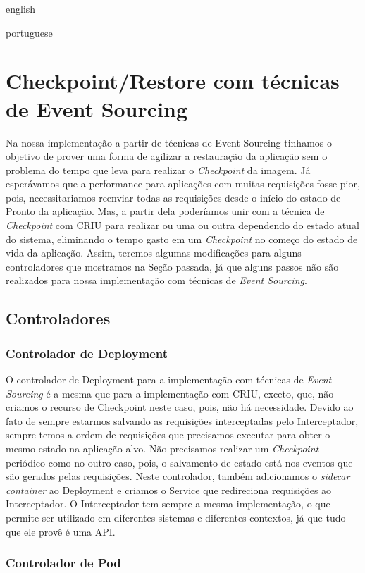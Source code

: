\begin{otherlanguage*}{english}
\begin{otherlanguage*}{portuguese}
\section{Checkpoint/Restore com técnicas de Event Sourcing}

Na nossa implementação a partir de técnicas de Event Sourcing tinhamos o objetivo de
prover uma forma de agilizar a restauração da aplicação sem o problema do tempo que leva
para realizar o \textit{Checkpoint} da imagem. Já esperávamos que a performance para
aplicações com muitas requisições fosse pior, pois, necessitariamos reenviar todas as
requisições desde o início do estado de Pronto da aplicação. Mas, a partir dela
poderíamos unir com a técnica de \textit{Checkpoint} com CRIU para realizar ou uma ou
outra dependendo do estado atual do sistema, eliminando o tempo gasto em um
\textit{Checkpoint} no começo do estado de vida da aplicação. Assim, teremos algumas
modificações para alguns controladores que mostramos na Seção passada, já que alguns
passos não são realizados para nossa implementação com técnicas de \textit{Event Sourcing}.

\subsection{Controladores}

\subsubsection{Controlador de Deployment}

O controlador de Deployment para a implementação com técnicas de \textit{Event Sourcing} é
a mesma que para a implementação com CRIU, exceto, que, não criamos o recurso de Checkpoint neste
caso, pois, não há necessidade. Devido ao fato de sempre estarmos salvando as requisições
interceptadas pelo Interceptador, sempre temos a ordem de requisições que precisamos
executar para obter o mesmo estado na aplicação alvo. Não precisamos realizar um
\textit{Checkpoint} periódico como no outro caso, pois, o salvamento de estado está nos
eventos que são gerados pelas requisições. Neste controlador, também adicionamos o 
\textit{sidecar container} ao Deployment e criamos o Service que redireciona requisições
ao Interceptador. O Interceptador tem sempre a mesma implementação, o que permite ser
utilizado em diferentes sistemas e diferentes contextos, já que tudo que ele provê é uma
API.

\subsubsection{Controlador de Pod}


\end{otherlanguage*}
\end{otherlanguage*}
